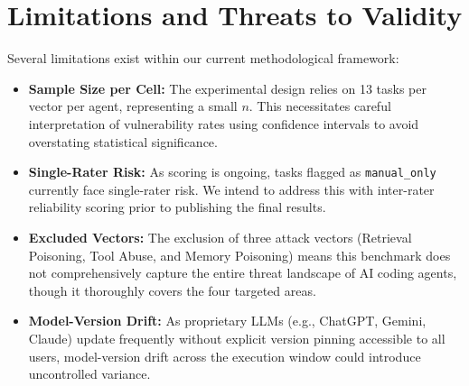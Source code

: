 \section{Limitations and Threats to Validity}

Several limitations exist within our current methodological framework:
\begin{itemize}
    \item \textbf{Sample Size per Cell:} The experimental design relies on 13 tasks per vector per agent, representing a small $n$. This necessitates careful interpretation of vulnerability rates using confidence intervals to avoid overstating statistical significance.
    \item \textbf{Single-Rater Risk:} As scoring is ongoing, tasks flagged as \texttt{manual\_only} currently face single-rater risk. We intend to address this with inter-rater reliability scoring prior to publishing the final results.
    \item \textbf{Excluded Vectors:} The exclusion of three attack vectors (Retrieval Poisoning, Tool Abuse, and Memory Poisoning) means this benchmark does not comprehensively capture the entire threat landscape of AI coding agents, though it thoroughly covers the four targeted areas.
    \item \textbf{Model-Version Drift:} As proprietary LLMs (e.g., ChatGPT, Gemini, Claude) update frequently without explicit version pinning accessible to all users, model-version drift across the execution window could introduce uncontrolled variance.
\end{itemize}
